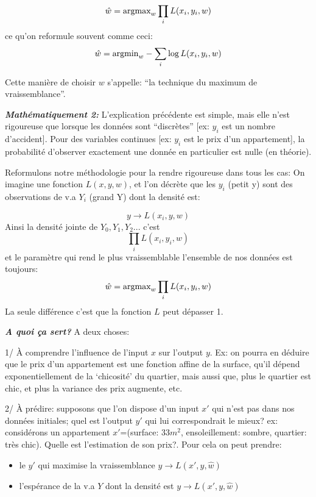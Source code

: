 \documentclass[11pt]{article}
\providecommand{\tightlist}{%
      \setlength{\itemsep}{0pt}\setlength{\parskip}{0pt}}
\begin{document}
\[
        \hat w = \hbox{argmax}_w \prod_i  L( x_i , y_i , w ) 
\] ce qu'on reformule souvent comme ceci: \[
        \hat w = \hbox{argmin}_w - \sum_i  \log L( x_i , y_i , w ) 
\]

Cette manière de choisir \(w\) s'appelle: ``la technique du maximum de
vraissemblance''.

\textbf{\emph{Mathématiquement 2:}} L'explication précédente est simple,
mais elle n'est rigoureuse que lorsque les données sont ``discrètes''
{[}ex: \(y_i\) est un nombre d'accident{]}. Pour des variables continues
{[}ex: \(y_i\) est le prix d'un appartement{]}, la probabilité
d'observer exactement une donnée en particulier est nulle (en théorie).

Reformulons notre méthodologie pour la rendre rigoureuse dans tous les
cas: On imagine une fonction \(L(x,y,w)\), et l'on décrète que les
\(y_i\) (petit y) sont des observations de v.a \(Y_i\) (grand Y) dont la
densité est:

\[
         y \to  L(x_i,y,w)
\] Ainsi la densité jointe de \(Y_0,Y_1,Y_2...\) c'est \[
\prod_i  L( x_i , y_i , w ) 
\] et le paramètre qui rend le plus vraissemblable l'ensemble de nos
données est toujours: \[
        \hat w =\hbox{argmax}_w \prod_i  L( x_i , y_i , w ) 
\] La seule différence c'est que la fonction \(L\) peut dépasser 1.

\textbf{\emph{A quoi ça sert?}} A deux choses:

1/ À comprendre l'influence de l'input \(x\) sur l'output \(y\). Ex: on
pourra en déduire que le prix d'un appartement est une fonction affine
de la surface, qu'il dépend exponentiellement de la `chicosité' du
quartier, mais aussi que, plus le quartier est chic, et plus la variance
des prix augmente, etc.

2/ À prédire: supposons que l'on dispose d'un input \(x'\) qui n'est pas
dans nos données initiales; quel est l'output \(y'\) qui lui
correspondrait le mieux? ex: considérons un appartement \(x'\)=(surface:
33\(m^2\), ensoleillement: sombre, quartier: très chic). Quelle est
l'estimation de son prix?. Pour cela on peut prendre:

\begin{itemize}
\tightlist
\item
  le \(y'\) qui maximise la vraissemblance \(y\to L(x',y,\hat w)\)\\
\item
  l'espérance de la v.a \(Y\) dont la densité est
  \(y\to L(x',y,\hat w)\)
\end{itemize}
\end{document}
